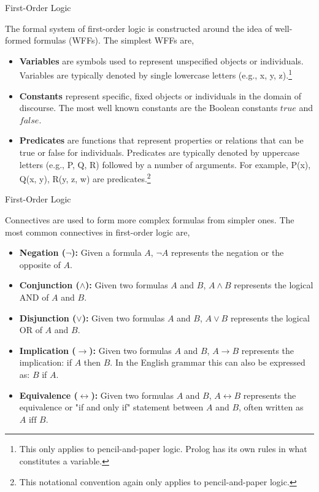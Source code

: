\documentclass{beamer}
\begin{document}
\begin{frame}{First-Order Logic}

The formal system of first-order logic is constructed around the idea of well-formed formulas (WFFs).
The simplest WFFs are,
\begin{itemize}
\item
{\bf Variables} are symbols used to represent unspecified objects or individuals. Variables are typically denoted by single lowercase letters (e.g., x, y,  z).\footnote{This only applies to pencil-and-paper logic. Prolog has its own rules in what constitutes a variable.}

\item
{\bf Constants} represent specific, fixed objects or individuals in the domain of discourse. 
The most well known constants are the Boolean constants $\mathit{true}$ and $\mathit{false}$.

\item
{\bf Predicates} are functions that represent properties or relations that can be true or false for individuals. Predicates are typically denoted by uppercase letters (e.g., P, Q, R) followed by a number of arguments. For example, P(x), Q(x, y), R(y, z, w) are predicates.\footnote{This notational convention again only applies to pencil-and-paper logic.}

\end{itemize}

\end{frame}



\begin{frame}{First-Order Logic}

Connectives are used to form more complex formulas from simpler ones. 
The most common connectives in first-order logic are,
\begin{itemize}
\item
{\bf Negation ($\neg$):} 
Given a formula $A$, $\neg A$ represents the negation or the opposite of $A$.

\item
{\bf Conjunction ($\wedge$):}
Given two formulas $A$ and $B$, $A \wedge B$ represents the logical AND of $A$ and $B$.

\item
{\bf Disjunction ($\vee$):} 
Given two formulas $A$ and $B$, $A \vee B$ represents the logical OR of $A$ and $B$.

\item
{\bf Implication ($\rightarrow$):} 
Given two formulas $A$ and $B$, $A \rightarrow B$ represents the implication: if $A$ then $B$.
In the English grammar this can also be expressed as: $B$ if $A$.

\item
{\bf Equivalence ($\leftrightarrow$):}
Given two formulas $A$ and $B$, $A \leftrightarrow B$ represents the equivalence or "if and only if" statement between $A$ and $B$, often written as $A \mbox{ iff } B$.

\end{itemize}

\end{frame}
\end{document}
